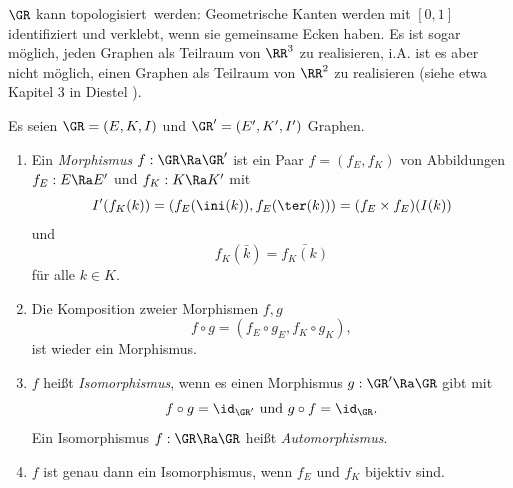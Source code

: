 \BEM $\GR$ kann \glqq topologisiert\grqq\ werden:
Geometrische Kanten werden mit $[0,1]$ identifiziert und verklebt,
wenn sie gemeinsame Ecken haben. Es ist sogar möglich, jeden
Graphen als Teilraum von $\RR^3$ zu realisieren, i.A. ist es aber nicht möglich, einen Graphen als Teilraum von $\RR^2$ zu realisieren
(siehe etwa Kapitel 3 in Diestel \cite{diestel}).

\DB Es seien $\GR=(E,K,I)$ und $\GR'=(E',K',I')$ Graphen.
\begin{enumerate}
\item Ein \emph{Morphismus} $f:\GR\Ra\GR'$ ist ein
Paar $f=(f_E,f_K)$ von Abbildungen
$f_E:E\Ra E'$ und $f_K:K\Ra K'$ mit
\[
I'(f_K(k)) = ( f_E(\ini(k)), f_E(\ter(k)) )
= (f_E \times f_E)(I(k))
\]
und
\[
f_K(\bar{k}) = \bar{f_K(k)}
\]
für alle $k\in K$.
\item Die Komposition zweier Morphismen $f,g$
\[
f\circ g = (f_E\circ g_E, f_K\circ g_K),
\]
ist wieder ein Morphismus.
\item $f$ heißt \emph{Isomorphismus}, wenn es
einen Morphismus $g:\GR'\Ra\GR$ gibt mit
\[
f\circ g = \id_{\GR'} \text{ und } g\circ f=\id_{\GR}.
\]
Ein Isomorphismus $f:\GR\Ra\GR$ heißt \emph{Automorphismus}.
\item $f$ ist genau dann ein Isomorphismus, wenn $f_E$ und $f_K$
bijektiv sind.
\end{enumerate}

